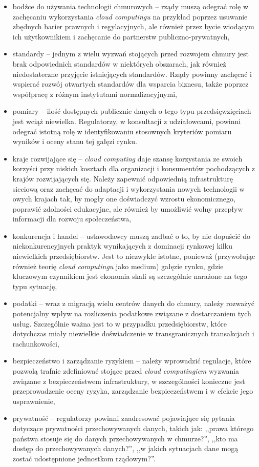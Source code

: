 \documentclass[12pt,a4paper,twoside]{article}
\begin{document}
\begin{itemize}
\item bodźce do używania technologii chmurowych -- rządy muszą odegrać rolę w zachęcaniu wykorzystania \textit{cloud computingu} na przykład poprzez usuwanie zbędnych barier prawnych i regylacyjnych, ale również przez bycie wiodącym ich użytkownikiem i zachęcanie do partnerstw publiczno-prywatnych,
\item standardy -- jednym z wielu wyzwań stojących przed rozwojem chmury jest brak odpowiednich standardów w niektórych obszarach, jak również niedostateczne przyjęcie istniejących standardów. Rządy powinny zachęcać i wspierać rozwój otwartych standardów dla wsparcia biznesu, także poprzez współpracę z różnym instytutami normalizacyjnymi,
\item pomiary -- ilość dostępnych publicznie danych o tego typu przedsięwzięciach jest wciąż niewielka. Regulatorzy, w konsultacji z udziałowcami, powinni odegrać istotną rolę w identyfikowaniu stosownych kryteriów pomiaru wyników i oceny stanu tej gałęzi rynku.
\item kraje rozwijające się -- \textit{cloud computing} daje szansę korzystania ze swoich korzyści przy niskich kosztach dla organizacji i konsumentów pochodzących z krajów rozwijających się. Należy zapewnić odpowiednią infrastrukturę sieciową oraz zachęcać do adaptacji i wykorzystania nowych technologii w owych krajach tak, by mogły one doświadczyć wzrostu ekonomicznego, poprawić zdolności edukacyjne, ale również by umożliwić wolny przepływ informacji dla rozwoju społeczeństwa,
\item konkurencja i handel -- ustawodawcy muszą zadbać o to, by nie dopuścić do niekonkurencyjnych praktyk wynikających z dominacji rynkowej kilku niewielkich przedsiębiorstw. Jest to niezwykle istotne, ponieważ (przywołując również teorię \textit{cloud computingu} jako medium) gałęzie rynku, gdzie kluczowym czynnikiem jest ekonomia skali są szczególnie narażone na tego typu sytuację,
\item podatki -- wraz z migracją wielu centrów danych do chmury, należy rozważyć potencjalny wpływ na rozliczenia podatkowe związane z dostarczaniem tych usług. Szczególnie ważna jest to w przypadku przedsiębiorstw, które dotychczas miały niewielkie doświadczenie w transgranicznych transakcjach i rachunkowości,
\item bezpieczeństwo i zarządzanie ryzykiem -- należy wprowadzić regulacje, które pozwolą trafnie zdefiniować stojące przed \textit{cloud computingiem} wyzwania związane z bezpieczeństwem infrastruktury, w szczególności konieczne jest przeprowadzenie oceny ryzyka, zarządzanie bezpieczeństwem i w efekcie jego usprawnienie,
\item prywatność -- regulatorzy powinni zaadresować pojawiające się pytania dotyczące prywatności przechowywanych danych, takich jak: ,,prawa którego państwa stosuje się do danych przechowywanych w chmurze?'', ,,kto ma dostęp do przechowywanych danych?'', ,,w jakich sytuacjach dane mogą zostać udostępnione jednostkom rządowym?''.
\end{itemize}
\end{document}
